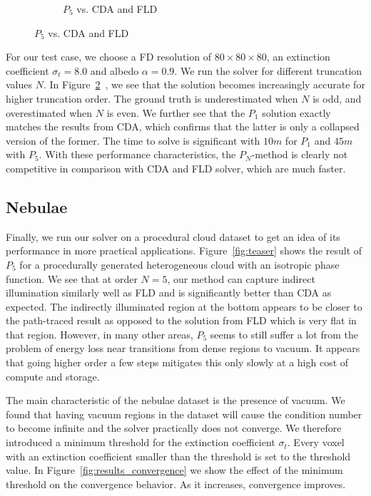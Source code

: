 \begin{figure}[h]
\begin{subfigure}{0.45\columnwidth}
\caption{$P_5$ vs. CDA and FLD}
\label{fig:pointsource_p5}
\end{subfigure}%
\vspace{-0.1in}
\label{fig:pointsource}
\end{figure}

For our test case, we choose a FD resolution of $80\times80\times80$, an extinction coefficient $\sigma_t=8.0$ and albedo $\alpha=0.9$. We run the solver for different truncation values $N$. In Figure~\ref{fig:pointsource}~, we see that the solution becomes increasingly accurate for higher truncation order. The ground truth is underestimated when $N$ is odd, and overestimated when $N$ is even. We further see that the $P_1$ solution exactly matches the results from CDA, which confirms that the latter is only a collapsed version of the former. The time to solve is significant with $10m$ for $P_1$ and $45m$ with $P_5$. With these performance characteristics, the $P_N$-method is clearly not competitive in comparison with CDA and FLD solver, which are much faster.

\subsection{Nebulae}

Finally, we run our solver on a procedural cloud dataset to get an idea of its performance in more practical applications. Figure~\ref{fig:teaser} shows the result of $P_5$ for a procedurally generated heterogeneous cloud with an isotropic phase function. We see that at order $N=5$, our method can capture indirect illumination similarly well as FLD and is significantly better than CDA as expected. The indirectly illuminated region at the bottom appears to be closer to the path-traced result as opposed to the solution from FLD which is very flat in that region. However, in many other areas, $P_5$ seems to still suffer a lot from the problem of energy loss near transitions from dense regions to vacuum. It appears that going higher order a few steps mitigates this only slowly at a high cost of compute and storage.

The main characteristic of the nebulae dataset is the presence of vacuum. We found that having vacuum regions in the dataset will cause the condition number to become infinite and the solver practically does not converge. We therefore introduced a minimum threshold for the extinction coefficient $\sigma_t$. Every voxel with an extinction coefficient smaller than the threshold is set to the threshold value. In Figure~\ref{fig:results_convergence} we show the effect of the minimum threshold on the convergence behavior. As it increases, convergence improves.

